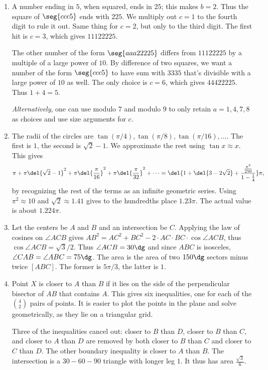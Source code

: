 \documentclass[10pt,paper=letter]{scrartcl}
\begin{document}
\begin{enumerate}
  \item A number ending in $5$, when squared, ends in $25$; this makes $b = 2$. Thus the square of $\seg{ccc5}$ ends with $225$. We multiply out $c = 1$ to the fourth digit to rule it out. Same thing for $c = 2$, but only to the third digit. The first hit is $c = 3$, which gives $11122225$. 

  The other number of the form $\seg{aaa22225}$ differs from $11122225$ by a multiple of a large power of $10$. By difference of two squares, we want a number of the form $\seg{ccc5}$ to have sum with $3335$ that's divisible with a large power of $10$ as well. The only choice is $c = 6$, which gives $44422225$. Thus $1 + 4 = 5$.

  \emph{Alternatively}, one can use modulo $7$ and modulo $9$ to only retain $a = 1, 4, 7, 8$ as choices and use size arguments for $c$. 

  \item The radii of the circles are $\tan(\pi/4), \tan(\pi/8), \tan(\pi/16), \ldots$. The first is $1$, the second is $\sqrt2 - 1$. We approximate the rest using $\tan x \approx x$. This gives $$\pi + \pi\del{\sqrt2-1}^2 + \pi\del{\frac{\pi}{16}}^2 + \pi\del{\frac{\pi}{32}}^2 + \cdots = \del{1 + \del{3 - 2\sqrt2} + \frac{\frac{\pi^2}{256}}{1 - \frac14}}\pi,$$ by recognizing the rest of the terms as an infinite geometric series. Using $\pi^2 \approx 10$ and $\sqrt2 \approx 1.41$ gives to the hundredths place $1.23\pi$. The actual value is about $1.224\pi$.
  \item Let the centers be $A$ and $B$ and an intersection be $C$. Applying the law of cosines on $\angle ACB$ gives $AB^2 = AC^2 + BC^2 - 2\cdot AC\cdot BC\cdot\cos\angle ACB$, thus $\cos \angle ACB = \sqrt3/2$. Thus $\angle ACB = 30\dg$ and since $ABC$ is isosceles, $\angle CAB = \angle ABC = 75\dg$. The area is the area of two $150\dg$ sectors minus twice $[ABC]$. The former is $5\pi/3$, the latter is $1$.

  \item Point $X$ is closer to $A$ than $B$ if it lies on the side of the perpendicular bisector of $AB$ that contains $A$. This gives six inequalities, one for each of the $\binom42$ pairs of points. It is easier to plot the points in the plane and solve geometrically, as they lie on a triangular grid.

  Three of the inequalities cancel out: closer to $B$ than $D$, closer to $B$ than $C$, and closer to $A$ than $D$ are removed by both closer to $B$ than $C$ and closer to $C$ than $D$. The other boundary inequality is closer to $A$ than $B$. The intersection is a $30-60-90$ triangle with longer leg $1$. It thus has area $\frac{\sqrt3}{6}$.


\end{enumerate}
\end{document}

